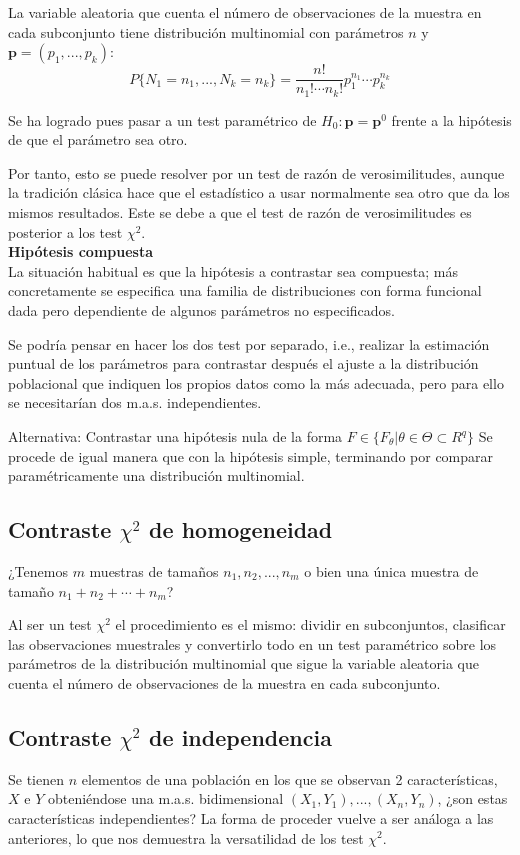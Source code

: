 \documentclass[a4paper,12pt]{article}
\begin{document}
La variable aleatoria que cuenta el número de observaciones de la muestra en cada subconjunto tiene distribución multinomial con parámetros $n$ y $\textbf{p}= (p_1,...,p_k)$:
$$P\{N_1=n_1,...,N_k=n_k\}= \frac{n!}{n_1!\cdots n_k!} p^{n_1}_1\cdots p^{n_k}_k$$

Se ha logrado pues pasar a un test paramétrico de $H_0 :   \textbf{p} = \textbf{p}^0$ frente a la hipótesis de que el parámetro sea otro.

Por tanto, esto se puede resolver por un test de razón de verosimilitudes, aunque la tradición clásica hace que el estadístico a usar normalmente sea otro que da los mismos resultados. Este se debe a que el test de razón de verosimilitudes es posterior a los test $\chi^2$.
\\

\textbf{Hipótesis compuesta} \\
La situación habitual es que la hipótesis a contrastar sea compuesta; más concretamente se especifica una familia de distribuciones con forma funcional dada pero dependiente de algunos parámetros no especificados.

Se podría pensar en hacer los dos test por separado, i.e., realizar la estimación puntual de los parámetros para contrastar después el ajuste a la distribución poblacional que indiquen los propios datos como la más adecuada, pero para ello se necesitarían dos m.a.s. independientes.

Alternativa: Contrastar una hipótesis nula de la forma $F \in \{F_\theta| \theta \in \Theta \subset R^q\}$
Se procede de igual manera que con la hipótesis simple, terminando por comparar paramétricamente una distribución multinomial.

\subsection{Contraste $\chi^2$ de homogeneidad}
¿Tenemos $m$ muestras de tamaños $n_1, n_2,...,n_m$ o bien una única muestra de tamaño $n_1+n_2+\cdots + n_m$?

Al ser un test $\chi ^2$ el procedimiento es el mismo: dividir en subconjuntos, clasificar las observaciones muestrales y convertirlo todo en un test paramétrico sobre los parámetros de la distribución multinomial que sigue la variable aleatoria que cuenta el número de observaciones de la muestra en cada subconjunto. 

\subsection{Contraste $\chi^2$ de independencia}
Se tienen $n$ elementos de una población en los que se observan 2 características, $X$ e $Y$ obteniéndose una m.a.s. bidimensional $(X_1,Y_1),...,(X_n,Y_n)$, ¿son estas características independientes? La forma de proceder vuelve a ser análoga a las anteriores, lo que nos demuestra la versatilidad de los test $\chi^2$.
\end{document}
